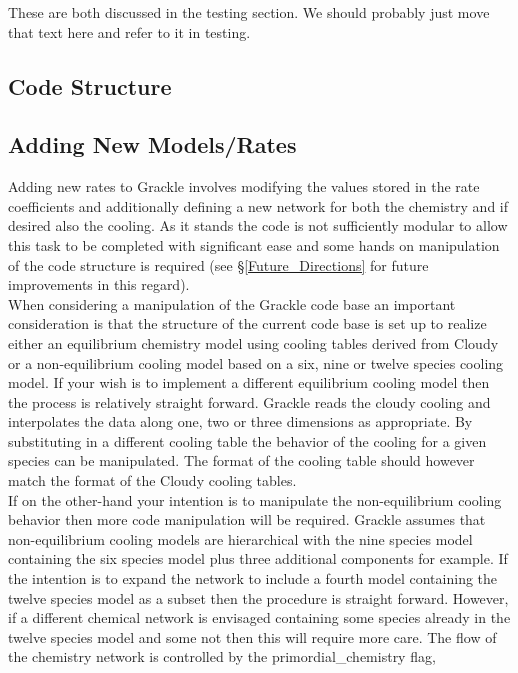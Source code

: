 These are both discussed in the testing section.  We should probably
just move that text here and refer to it in testing.

\subsection{Code Structure} \label{Code_Structure}

\subsection{Adding New Models/Rates}

Adding new rates to Grackle involves modifying the values stored in the rate coefficients and 
additionally defining a new network for both the chemistry and if desired also the cooling. As it stands the
code is not sufficiently modular to allow this task to be completed with significant ease and some
hands on manipulation of the code structure is required (see \S \ref{Future_Directions} for 
future improvements in this regard). \\
\indent When considering a manipulation of the Grackle code base an important consideration is that the structure
of the current code base is set up to realize either an equilibrium chemistry model using cooling tables
derived from Cloudy or a non-equilibrium cooling model based on a six, nine or twelve species cooling model. 
If your wish is to implement a different equilibrium cooling model then the process is relatively straight
forward. Grackle reads the cloudy cooling and interpolates the data along one, two or three dimensions as
appropriate. By substituting in a different cooling table the behavior of the cooling for a given species
can be manipulated. The format of the cooling table should however match the format of the Cloudy cooling
tables. \\
\indent If on the other-hand your intention is to manipulate the non-equilibrium cooling behavior then more
code manipulation will be required. Grackle assumes that non-equilibrium cooling models are hierarchical
with the nine species model containing the six species model plus three additional components for example. 
If the intention is to expand the network to include a fourth model containing the twelve species model as 
a subset then the procedure is straight forward. However, if a different chemical network is envisaged 
containing some species already in the twelve species model and some not then this will require more care. 
The flow of the chemistry network is controlled by the primordial\_chemistry flag, 
